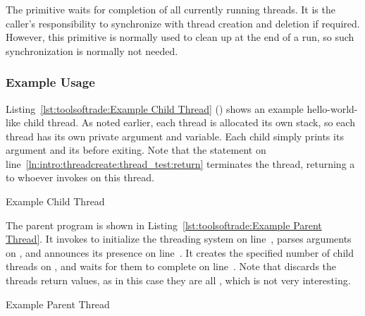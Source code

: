 \subsubsection{}

The 
primitive waits for completion of all currently running threads.
It is the caller's responsibility to synchronize with thread creation
and deletion if required.
However, this primitive is normally used to clean up at the end of
a run, so such synchronization is normally not needed.

\subsubsection{Example Usage}

Listing~\ref{lst:toolsoftrade:Example Child Thread} ()
shows an example hello-world-like child thread.
As noted earlier, each thread is allocated its own stack, so
each thread has its own private  argument and  variable.
Each child simply prints its argument and its 
before exiting.
Note that the  statement on
line~\ref{ln:intro:threadcreate:thread_test:return} terminates the thread,
returning a  to whoever invokes  on this
thread.

\begin{listing}[tbp]

\caption{Example Child Thread}
\label{lst:toolsoftrade:Example Child Thread}
\end{listing}

\begin{fcvref}
The parent program is shown in
Listing~\ref{lst:toolsoftrade:Example Parent Thread}.
It invokes  to initialize the threading system on
line~,
parses arguments on ,
and announces its presence on line~.
It creates the specified number of child threads on
,
and waits for them to complete on line~.
Note that  discards the threads return values,
as in this case they are all , which is not very interesting.
\end{fcvref}

\begin{listing}[tbp]

\caption{Example Parent Thread}
\label{lst:toolsoftrade:Example Parent Thread}
\end{listing}


